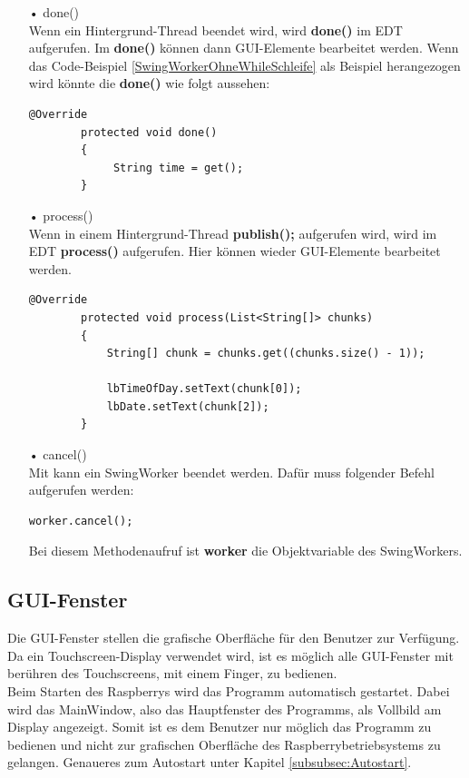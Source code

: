 \begin{itemize}
\item[•] done()
\\ Wenn ein Hintergrund-Thread beendet wird, wird \textbf{done()} im EDT aufgerufen. Im \textbf{done()} können dann GUI-Elemente bearbeitet werden. Wenn das Code-Beispiel \ref{SwingWorkerOhneWhileSchleife} als Beispiel herangezogen wird könnte die \textbf{done()} wie folgt aussehen:
\begin{lstlisting}[style=JavaStyle, caption=SwingWorker done()]
	    @Override
        protected void done()
        {
             String time = get();
        }
\end{lstlisting}
\item[•] process()
\\ Wenn in einem Hintergrund-Thread \textbf{publish();} aufgerufen wird, wird im EDT \textbf{process()} aufgerufen. Hier können wieder GUI-Elemente bearbeitet werden.
\begin{lstlisting}[style=JavaStyle, caption=SwingWorker process()]
        @Override
        protected void process(List<String[]> chunks)
        {
            String[] chunk = chunks.get((chunks.size() - 1));
            
            lbTimeOfDay.setText(chunk[0]);
            lbDate.setText(chunk[2]);
        }
\end{lstlisting}
\item[•] cancel()
\\ Mit  kann ein SwingWorker beendet werden. Dafür muss folgender Befehl aufgerufen werden:
\begin{lstlisting}[style=JavaStyle, caption=SwingWorker abbrechen]
	    worker.cancel();
\end{lstlisting}
Bei diesem Methodenaufruf ist \textbf{worker} die Objektvariable des SwingWorkers.
\end{itemize}

\subsection{GUI-Fenster}
Die GUI-Fenster stellen die grafische Oberfläche für den Benutzer zur Verfügung. Da ein Touchscreen-Display verwendet wird, ist es möglich alle GUI-Fenster mit berühren des Touchscreens, mit einem Finger, zu bedienen. 
\\ Beim Starten des Raspberrys wird das Programm automatisch gestartet. Dabei wird das MainWindow, also das Hauptfenster des Programms, als Vollbild am Display angezeigt. Somit ist es dem Benutzer nur möglich das Programm zu bedienen und nicht zur grafischen Oberfläche des Raspberrybetriebsystems zu gelangen. Genaueres zum Autostart unter Kapitel \ref{subsubsec:Autostart}.

